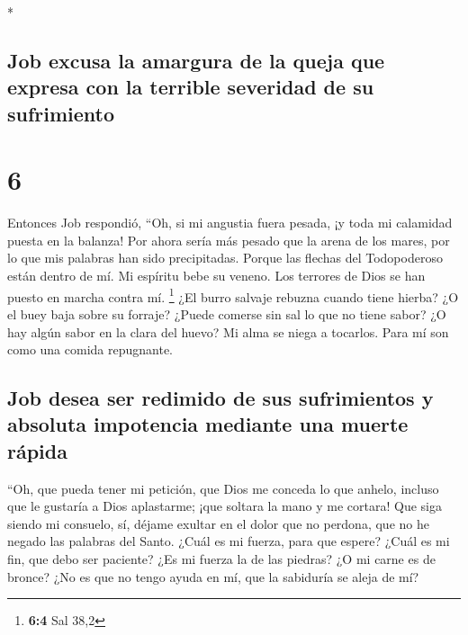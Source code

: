 \begin{paracol}{2}
\begin{otherlanguage}{english}
\end{otherlanguage}

\switchcolumn[0]*

\hypertarget{job-excusa-la-amargura-de-la-queja-que-expresa-con-la-terrible-severidad-de-su-sufrimiento}{%
\subsection{Job excusa la amargura de la queja que expresa con la
terrible severidad de su
sufrimiento}\label{job-excusa-la-amargura-de-la-queja-que-expresa-con-la-terrible-severidad-de-su-sufrimiento}}

\hypertarget{section-10}{%
\section{6}\label{section-10}}

 Entonces Job respondió,  ``Oh, si mi
angustia fuera pesada, ¡y toda mi calamidad puesta en la balanza!
 Por ahora sería más pesado que la arena de los mares, por
lo que mis palabras han sido precipitadas.  Porque las
flechas del Todopoderoso están dentro de mí. Mi espíritu bebe su veneno.
Los terrores de Dios se han puesto en marcha contra mí. \footnote{\textbf{6:4}
  Sal 38,2}  ¿El burro salvaje rebuzna cuando tiene
hierba? ¿O el buey baja sobre su forraje?  ¿Puede comerse
sin sal lo que no tiene sabor? ¿O hay algún sabor en la clara del huevo?
 Mi alma se niega a tocarlos. Para mí son como una comida
repugnante.

\hypertarget{job-desea-ser-redimido-de-sus-sufrimientos-y-absoluta-impotencia-mediante-una-muerte-ruxe1pida}{%
\subsection{Job desea ser redimido de sus sufrimientos y absoluta
impotencia mediante una muerte
rápida}\label{job-desea-ser-redimido-de-sus-sufrimientos-y-absoluta-impotencia-mediante-una-muerte-ruxe1pida}}

 ``Oh, que pueda tener mi petición, que Dios me conceda lo
que anhelo,  incluso que le gustaría a Dios aplastarme;
¡que soltara la mano y me cortara!  Que siga siendo mi
consuelo, sí, déjame exultar en el dolor que no perdona, que no he
negado las palabras del Santo.  ¿Cuál es mi fuerza, para
que espere? ¿Cuál es mi fin, que debo ser paciente?  ¿Es
mi fuerza la de las piedras? ¿O mi carne es de bronce? 
¿No es que no tengo ayuda en mí, que la sabiduría se aleja de mí?


\end{paracol}
